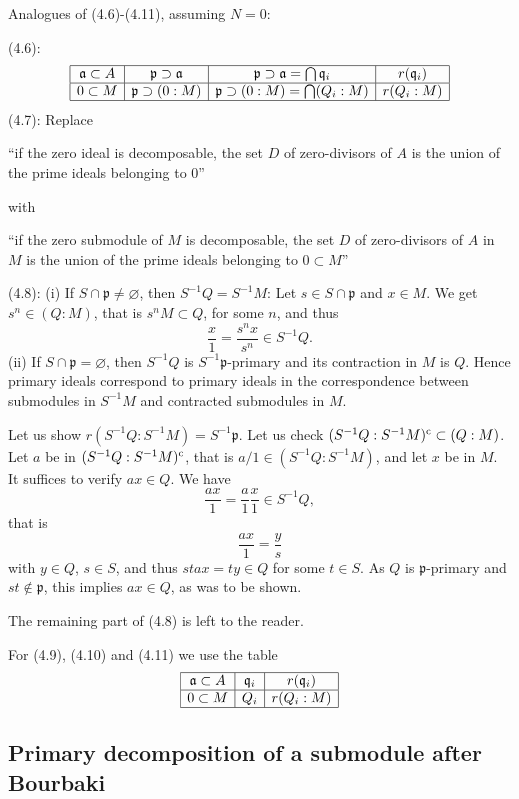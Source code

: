 \documentclass[parskip=half,fontsize=12pt]{scrartcl}%
\newcommand{\mf}{\mathfrak}
\newcommand{\aaa}{\mf a}
\newcommand{\ppp}{\mf p}
\newcommand{\qqq}{\mf q}
\begin{document}
Analogues of (4.6)-(4.11), assuming $N=0$: 

(4.6):
$$
\begin{array}{|c|c|c|c|}\hline
\aaa\subset A&\ppp\supset\aaa&\ppp\supset\aaa=\bigcap\qqq_i&r(\qqq_i)\\ \hline 
0\subset M&\ppp\supset(0:M)&\ppp\supset(0:M)=\bigcap(Q_i:M)&r(Q_i:M)\\ \hline
\end{array}
$$ 
(4.7): Replace 

``if the zero ideal is decomposable, the set $D$ of zero-divisors of $A$ is the union of the prime ideals belonging to $0$'' 

with 

``if the zero submodule of $M$ is decomposable, the set $D$ of zero-divisors of $A$ in $M$ is the union of the prime ideals belonging to $0\subset M$''

(4.8): (i) If $S\cap\ppp\ne\varnothing$, then $S^{-1}Q=S^{-1}M$: Let $s\in S\cap\ppp$ and $x\in M$. We get $s^n\in(Q:M)$, that is $s^nM\subset Q$, for some $n$, and thus 
$$
\frac x1=\frac{s^nx}{s^n}\in S^{-1}Q.
$$ 
(ii) If $S\cap\ppp=\varnothing$, then $S^{-1}Q$ is $S^{-1}\ppp$-primary and its contraction in $M$ is $Q$. Hence primary ideals correspond to primary ideals in the correspondence between submodules in $S^{-1}M$ and contracted submodules in $M$.

Let us show $r(S^{-1}Q:S^{-1}M)=S^{-1}\ppp$. Let us check $(S^{-1}Q:S^{-1}M)^{\text c}\subset (Q:M)$. Let $a$ be in $(S^{-1}Q:S^{-1}M)^{\text c}$, that is $a/1\in (S^{-1}Q:S^{-1}M)$, and let $x$ be in $M$. It suffices to verify $ax\in Q$. We have  
$$
\frac{ax}1=\frac a1\frac x1\in S^{-1}Q,
$$ 
that is 
$$
\frac{ax}1=\frac ys
$$ 
with $y\in Q$, $s\in S$, and thus $stax=ty\in Q$ for some $t\in S$. As $Q$ is $\ppp$-primary and $st\notin\ppp$, this implies $ax\in Q$, as was to be shown. 

The remaining part of (4.8) is left to the reader.

For (4.9), (4.10) and (4.11) we use the table
$$
\begin{array}{|c|c|c|}\hline
\aaa\subset A&\qqq_i&r(\qqq_i)\\ \hline 
0\subset M&Q_i&r(Q_i:M)\\ \hline
\end{array}
$$ 

\subsection{Primary decomposition of a submodule after Bourbaki}%
\end{document}
